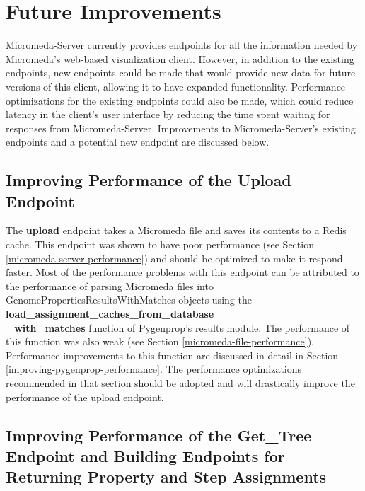 \section{Future Improvements} \label{micromeda-server-improvements}

Micromeda-Server currently provides endpoints for all the information needed by Micromeda's web-based visualization client. However, in addition to the existing endpoints, new endpoints could be made that would provide new data for future versions of this client, allowing it to have expanded functionality. Performance optimizations for the existing endpoints could also be made, which could reduce latency in the client's user interface by reducing the time spent waiting for responses from Micromeda-Server. Improvements to Micromeda-Server's existing endpoints and a potential new endpoint are discussed below.

\subsection{Improving Performance of the Upload Endpoint}

The \textbf{upload} endpoint takes a Micromeda file and saves its contents to a Redis cache. This endpoint was shown to have poor performance (see Section \ref{micromeda-server-performance}) and should be optimized to make it respond faster. Most of the performance problems with this endpoint can be attributed to the performance of parsing Micromeda files into GenomePropertiesResultsWithMatches objects using the \textbf{load\_assignment\_caches\_from\_database \\ \_with\_matches} function of Pygenprop's results module. The performance of this function was also weak (see Section \ref{micromeda-file-performance}). Performance improvements to this function are discussed in detail in Section \ref{improving-pygenprop-performance}. The performance optimizations recommended in that section should be adopted and will drastically improve the performance of the upload endpoint.

\subsection{Improving Performance of the Get\_Tree Endpoint and Building Endpoints for Returning Property and Step Assignments} \label{assignment-endpoints}

